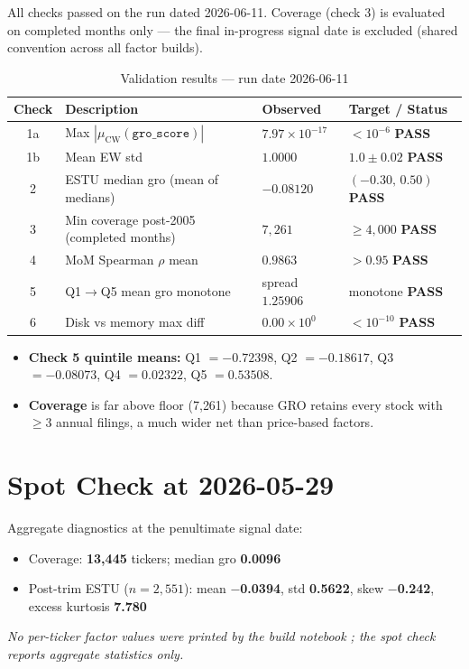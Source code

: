 \documentclass[11pt,a4paper]{article}
\newcommand{\PASS}[1]{\textcolor{pass}{\textbf{#1}}}
\newcommand{\NOTE}[1]{\textcolor{note}{\textit{#1}}}
\begin{document}
All checks passed on the run dated 2026-06-11. Coverage (check 3) is evaluated
on completed months only --- the final in-progress signal date is excluded
(shared convention across all factor builds).

\begin{table}[h!]
\centering
\caption{Validation results --- run date 2026-06-11}
\small
\begin{tabular}{clll}
\toprule
\textbf{Check} & \textbf{Description} & \textbf{Observed} & \textbf{Target / Status} \\
\midrule
1a & Max $|\mu_{\text{CW}}(\texttt{gro\_score})|$ & $7.97\times10^{-17}$ & $<10^{-6}$ \quad \PASS{PASS} \\
1b & Mean EW std & $1.0000$ & $1.0\pm0.02$ \quad \PASS{PASS} \\
2 & ESTU median gro (mean of medians) & $-0.08120$ & $(-0.30,\,0.50)$ \quad \PASS{PASS} \\
3 & Min coverage post-2005 (completed months) & $7{,}261$ & $\geq4{,}000$ \quad \PASS{PASS} \\
4 & MoM Spearman $\rho$ mean & $0.9863$ & $>0.95$ \quad \PASS{PASS} \\
5 & Q1$\to$Q5 mean gro monotone & spread $1.25906$ & monotone \quad \PASS{PASS} \\
6 & Disk vs memory max diff & $0.00\times10^{0}$ & $<10^{-10}$ \quad \PASS{PASS} \\
\bottomrule
\end{tabular}
\end{table}

\begin{itemize}[leftmargin=*,topsep=2pt,itemsep=2pt]
  \item \textbf{Check 5 quintile means:} Q1 $=-0.72398$, Q2 $=-0.18617$, Q3 $=-0.08073$, Q4 $=0.02322$, Q5 $=0.53508$.
  \item \textbf{Coverage} is far above floor (7{,}261) because GRO retains every stock with $\geq3$ annual filings, a much wider net than price-based factors.
\end{itemize}

\section{Spot Check at 2026-05-29}

Aggregate diagnostics at the penultimate signal date:

\begin{itemize}[leftmargin=*,topsep=2pt,itemsep=2pt]
  \item Coverage: \textbf{13{,}445} tickers; median gro \textbf{0.0096}
  \item Post-trim ESTU ($n=2{,}551$): mean \textbf{$-$0.0394}, std \textbf{0.5622}, skew \textbf{$-$0.242}, excess kurtosis \textbf{7.780}
\end{itemize}

\NOTE{No per-ticker factor values were printed by the build notebook
; the spot check reports aggregate statistics only.}
\end{document}

